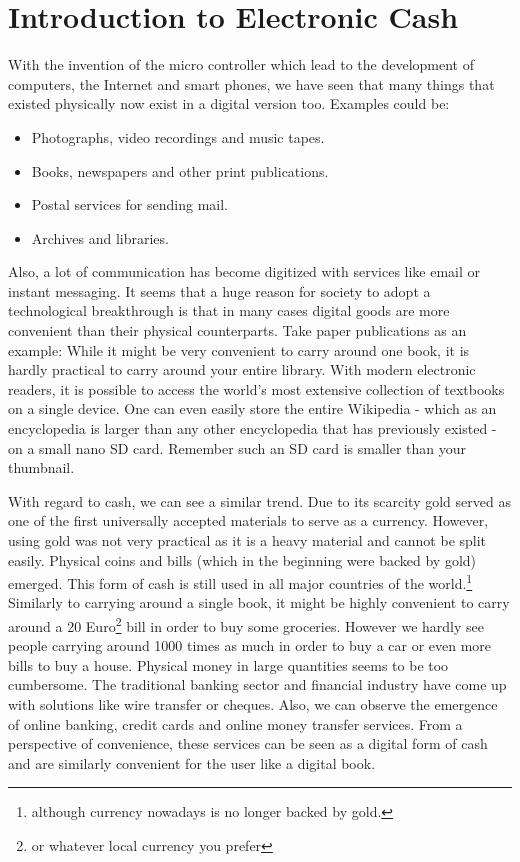 \documentclass[a4paper,12pt,oneside,openany]{book}
\begin{document}
\section{Introduction to Electronic Cash}
With the invention of the micro controller which lead to the development of computers, the Internet and smart phones, we have seen that many things that existed physically now exist in a digital version too.
Examples could be:
\begin{itemize}
\item Photographs, video recordings and music tapes.
\item Books, newspapers and other print publications.
\item Postal services for sending mail.
\item Archives and libraries.
\end{itemize}

Also, a lot of communication has become digitized with services like email or instant messaging.
It seems that a huge reason for society to adopt a technological breakthrough is that in many cases digital goods are more convenient than their physical counterparts.
Take paper publications as an example: While it might be very convenient to carry around one book, it is hardly practical to carry around your entire library.
With modern electronic readers, it is possible to access the world's most extensive collection of textbooks on a single device.
One can even easily store the entire Wikipedia - which as an encyclopedia is larger than any other encyclopedia that has previously existed - on a small nano SD card.
Remember such an SD card is smaller than your thumbnail.

With regard to cash, we can see a similar trend.
Due to its scarcity gold served as one of the first universally accepted materials to serve as a currency.
However, using gold was not very practical as it is a heavy material and cannot be split easily.
Physical coins and bills (which in the beginning were backed by gold) emerged.
This form of cash is still used in all major countries of the world.\footnote{although currency nowadays is no longer backed by gold.}
Similarly to carrying around a single book, it might be highly convenient to carry around a 20 Euro\footnote{or whatever local currency you prefer} bill in order to buy some groceries. However we hardly see people carrying around 1000 times as much in order to buy a car or even more bills to buy a house.
Physical money in large quantities seems to be too cumbersome. 
The traditional banking sector and financial industry have come up with solutions like wire transfer or cheques.
Also, we can observe the emergence of online banking, credit cards and online money transfer services.
From a perspective of convenience, these services can be seen as a digital form of cash and are similarly convenient for the user like a digital book.
\end{document}
